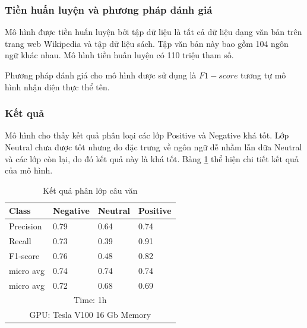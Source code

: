 \documentclass[14pt]{extreport}
\begin{document}
\subsubsection{Tiền huấn luyện và phương pháp đánh giá}
Mô hình được tiền huấn luyện bởi tập dữ liệu là tất cả dữ liệu dạng văn bản trên trang web Wikipedia và tập dữ liệu sách. Tập văn bản này bao gồm 104 ngôn ngữ khác nhau. Mô hình tiền huấn luyện có 110 triệu tham số.

Phương pháp đánh giá cho mô hình được sử dụng là $F1-score$ tương tự mô hình nhận diện thực thể tên.

\subsubsection{Kết quả}
Mô hình cho thấy kết quả phân loại các lớp Positive và Negative khá tốt. Lớp Neutral chưa được tốt nhưng do đặc trưng về ngôn ngữ dễ nhầm lẫn dữa Neutral và các lớp còn lại, do đó kết quả này là khá tốt. Bảng \ref{tab:cls} thể hiện chi tiết kết quả của mô hình.

\begin{table}[]
\begin{tabular}{ |p{3cm}||p{3cm}||p{3cm}||p{3cm}|  }
 \hline
 \hline
 Class &  Negative & Neutral & Positive \\
 \hline
 Precision & 0.79  & 0.64 & 0.74 \\
 Recall    & 0.73  & 0.39 & 0.91 \\
 F1-score  & 0.76  & 0.48 & 0.82 \\
 \hline
 micro avg & 0.74  & 0.74 & 0.74 \\
 micro avg & 0.72  & 0.68 & 0.69 \\
\hline
 \multicolumn{4}{|c|}{Time: 1h}\\
  \hline
 \multicolumn{4}{|c|}{GPU: Tesla V100 16 Gb Memory}   \\
 \hline
\end{tabular}
\caption{Kết quả phân lớp câu văn}
\label{tab:cls}
\end{table}
\end{document}
